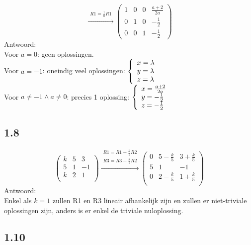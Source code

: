 \documentclass[11pt]{article}
\begin{document}
\[
\overset{\begin{matrix}
	R1=\frac{1}{a}R1
 \end{matrix}}{\rightarrow}
 \left(
\begin{array}{ccc|c}
1 & 0 & 0 & \frac{a+2}{2a} \\
0 & 1 & 0 & -\frac{1}{2} \\
0 & 0 & 1 & -\frac{1}{2}
\end{array}
\right)
\]
Antwoord:\\
Voor $a=0$: geen oplossingen.\\
Voor $a=-1$: oneindig veel oplossingen:
$
\left\{ 
  \begin{array}{l l}
    x=\lambda\\
	y=\lambda\\
	z=\lambda
  \end{array} \right.
$\\
Voor $a\neq-1\wedge a\neq0$: precies 1 oplossing:
$
\left\{ 
  \begin{array}{l l}
    x=\frac{a+2}{2a}\\
	y=-\frac{1}{2}\\
	z=-\frac{1}{2}
  \end{array} \right.
$

\subsection*{1.8}
\[
\begin{pmatrix}
  k & 5 & 3 \\
  5 & 1 & -1 \\
  k & 2 & 1 \\
 \end{pmatrix}
 \overset{\begin{matrix}
  R1 = R1-\frac{k}{5}R2 \\
  R3 = R3-\frac{k}{5}R2
 \end{matrix}}{\rightarrow}
 \begin{pmatrix}
  0 & 5-\frac{k}{5} & 3+\frac{k}{5} \\
  5 & 1 & -1 \\
  0 & 2-\frac{k}{5} & 1+\frac{k}{5} \\
 \end{pmatrix}
\]
Antwoord:\\
Enkel als $k=1$ zullen R1 en R3 lineair afhankelijk zijn en zullen er niet-triviale oplossingen zijn, anders is er enkel de triviale nuloplossing.

\subsection*{1.10}
\end{document}
